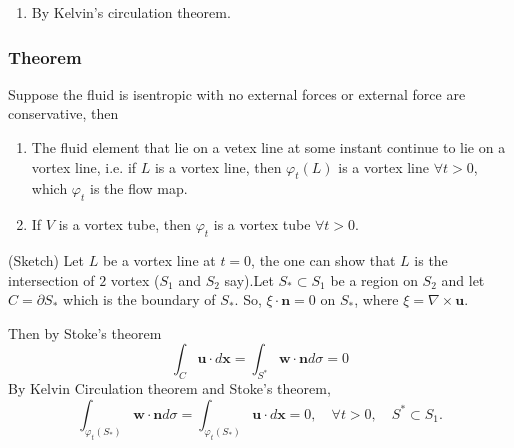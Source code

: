\begin{enumerate}
	\item By Kelvin's circulation theorem.

\end{enumerate}
\subsubsection{Theorem} %

Suppose the fluid is isentropic with no external forces or external force are conservative, then

\begin{enumerate}
	\item The fluid element that lie on a vetex line at some instant continue to lie on a vortex line, i.e. if $L$ is a vortex line, then $\varphi_t(L)$ is a vortex line $\forall t>0$, which $\varphi_t$ is the flow map.
	\item If $V$ is a vortex tube, then $\varphi_t$ is a vortex tube $\forall t>0$.

\end{enumerate}

(Sketch) Let $L$ be a vortex line at $t=0$, the one can show that $L$ is the intersection of $2$ vortex ($S_1$ and $S_2$ say).Let $S_{*}\subset S_1$ be a region on $S_2$ and let $C=\partial S_{*}$ which is the boundary of $S_{*}$. So, $\xi\cdot\textbf{n} = 0$ on $S_{*}$, where $\xi=\nabla\times\textbf{u}$.

Then by Stoke's theorem 
\begin{equation}
\int_{C} \textbf{u}\cdot d\textbf{x} = \int_{S^{*}} \textbf{w}\cdot\textbf{n}d\sigma = 0
\end{equation}
By Kelvin Circulation theorem and Stoke's theorem,
\begin{equation}
\int_{\varphi_t(S_*)} \textbf{w}\cdot \textbf{n}d\sigma =
\int_{\varphi_t(S_*)} \textbf{u}\cdot d\textbf{x} = 0,\quad \forall t>0,\quad S^{*} \subset S_1.
\end{equation}


